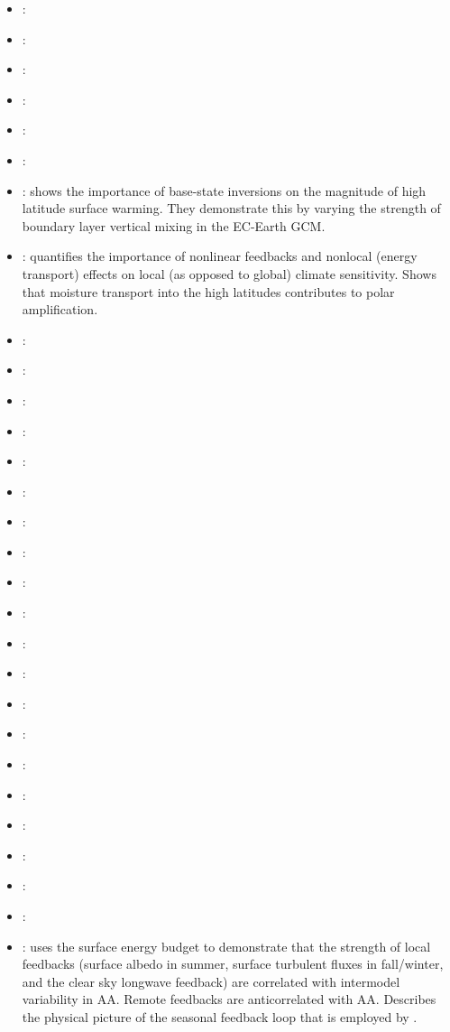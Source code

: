 \documentclass{article}
\begin{document}
\begin{itemize}
\item \textbf{\cite{lu2009}}:
\item \textbf{\cite{graversen2009}}:
\item \textbf{\cite{deser2010}}:
\item \textbf{\cite{screen2010}}:
\item \textbf{\cite{screen2010a}}:
\item \textbf{\cite{drijfhout2012}}: 
\item \textbf{\cite{bintanja2012}}: shows the importance of base-state inversions on the magnitude of high latitude surface warming. They demonstrate this by varying the strength of boundary layer vertical mixing in the EC-Earth GCM.
\item \textbf{\cite{feldl2013}}: quantifies the importance of nonlinear feedbacks and nonlocal (energy transport) effects on local (as opposed to global) climate sensitivity. Shows that moisture transport into the high latitudes contributes to polar amplification.
\item \textbf{\cite{pithan2014}}: 
\item \textbf{\cite{baggett2015}}: 
\item \textbf{\cite{carmack2015}}: 
\item \textbf{\cite{park2015}}: 
\item \textbf{\cite{park2015a}}: 
\item \textbf{\cite{baggett2016}}: 
\item \textbf{\cite{blackport2016}}: 
\item \textbf{\cite{laine2016}}: 
\item \textbf{\cite{overland2016}}: 
\item \textbf{\cite{overland2016a}}: 
\item \textbf{\cite{kim2016}}:
\item \textbf{\cite{woods2016}}:
\item \textbf{\cite{baggett2017}}: 
\item \textbf{\cite{blackport2017}}: 
\item \textbf{\cite{kim2017}}:
\item \textbf{\cite{hegyi2017}}:
\item \textbf{\cite{koyama2017}}:
\item \textbf{\cite{lee2017}}:
\item \textbf{\cite{mccusker2017}}: 
\item \textbf{\cite{blackport2018}}: 
\item \textbf{\cite{boeke2018}}: uses the surface energy budget to demonstrate that the strength of local feedbacks (surface albedo in summer, surface turbulent fluxes in fall/winter, and the clear sky longwave feedback) are correlated with intermodel variability in AA. Remote feedbacks are anticorrelated with AA. Describes the physical picture of the seasonal feedback loop that is employed by \citep{hankel2021}.

\end{itemize}
\end{document}
